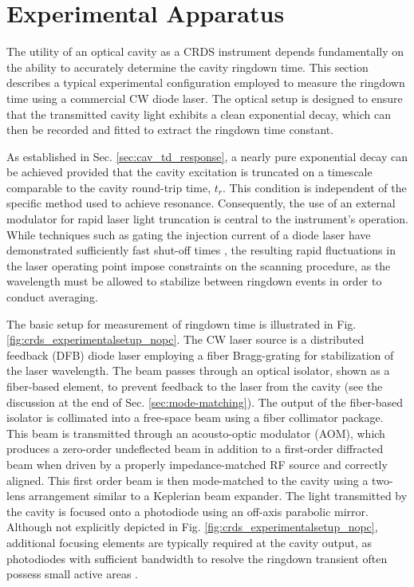 \documentclass[12pt]{report}
\begin{document}
	\section{Experimental Apparatus} \label{sec:crds_ringdown_meas}
	The utility of an optical cavity as a CRDS instrument depends fundamentally on the ability to accurately determine the cavity ringdown time. This section describes a typical experimental configuration employed to measure the ringdown time using a commercial CW diode laser. The optical setup is designed to ensure that the transmitted cavity light exhibits a clean exponential decay, which can then be recorded and fitted to extract the ringdown time constant.
	
	As established in Sec. \ref{sec:cav_td_response}, a nearly pure exponential decay can be achieved provided that the cavity excitation is truncated on a timescale comparable to the cavity round-trip time, $t_r$. This condition is independent of the specific method used to achieve resonance. Consequently, the use of an external modulator for rapid laser light truncation is central to the instrument's operation. While techniques such as gating the injection current of a diode laser have demonstrated sufficiently fast shut-off times \cite{wang_multispecies}, the resulting rapid fluctuations in the laser operating point impose constraints on the scanning procedure, as the wavelength must be allowed to stabilize between ringdown events in order to conduct averaging.
	
	The basic setup for measurement of ringdown time is illustrated in Fig. \ref{fig:crds_experimentalsetup_nopc}. The CW laser source is a distributed feedback (DFB) diode laser employing a fiber Bragg-grating for stabilization of the laser wavelength. The beam passes through an optical isolator, shown as a fiber-based element, to prevent feedback to the laser from the cavity (see the discussion at the end of Sec. \ref{sec:mode-matching}). The output of the fiber-based isolator is collimated into a free-space beam using a fiber collimator package. This beam is transmitted through an acousto-optic modulator (AOM), which produces a zero-order undeflected beam in addition to a first-order diffracted beam when driven by a properly impedance-matched RF source and correctly aligned. This first order beam is then mode-matched to the cavity using a two-lens arrangement similar to a Keplerian beam expander. The light transmitted by the cavity is focused onto a photodiode using an off-axis parabolic mirror.  Although not explicitly depicted in Fig. \ref{fig:crds_experimentalsetup_nopc}, additional focusing elements are typically required at the cavity output, as photodiodes with sufficient bandwidth to resolve the ringdown transient often possess small active areas \cite{Horowitz_ArtOfElectronics}.
	
\end{document}
